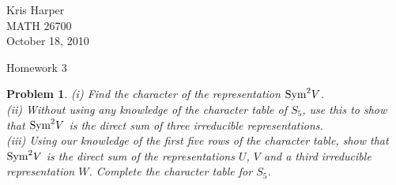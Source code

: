 \documentclass{article}
\newtheorem{problem}{Problem}
\newcommand{\sym}{\textup{Sym}}
\begin{document}
\begin{flushright}
Kris Harper\\

MATH 26700\\

October 18, 2010
\end{flushright}

\begin{center}
Homework 3
\end{center}

\begin{problem}
(i) Find the character of the representation $\sym^2 V$.\\
(ii) Without using any knowledge of the character table of $S_5$, use this to show that $\sym^2 V$ is the direct sum of three irreducible representations.\\
(iii) Using our knowledge of the first five rows of the character table, show that $\sym^2 V$ is the direct sum of the representations $U$, $V$ and a third irreducible representation $W$. Complete the character table for $S_5$.
\end{problem}
\end{document}
